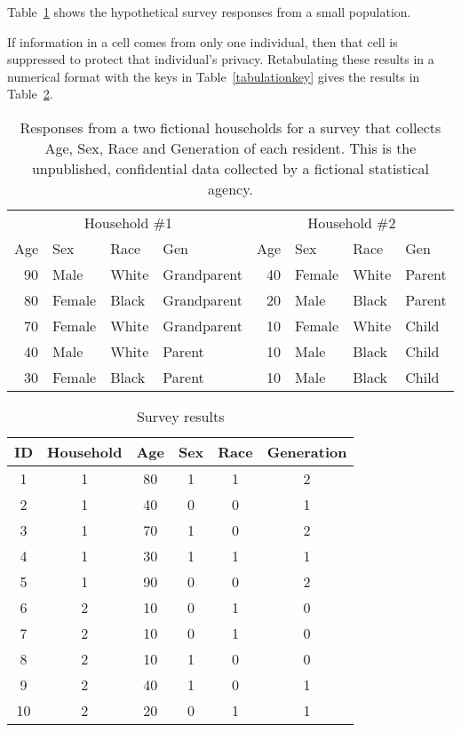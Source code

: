 \documentclass[runningheads]{llncs}
\begin{document}
Table~\ref{responses}
shows the hypothetical survey responses from a small population.

If
information in a cell comes from only one individual, then that cell
is suppressed to protect that individual's privacy.  Retabulating
these results in a numerical format with the keys in
Table~\ref{tabulationkey} gives the results in Table~\ref{resultsbig}.


\begin{table}
\begin{tabular}{rllp{1in}||rllp{1in}}
\multicolumn{4}{c||}{Household \#1}    & \multicolumn{4}{c}{Household \#2} \\
Age & Sex & Race & Gen                 & Age & Sex & Race & Gen \\
\hline
90 & Male & White & Grandparent        & 40 & Female & White & Parent\\
80 & Female & Black & Grandparent      & 20 & Male & Black & Parent\\
70 & Female & White & Grandparent      & 10 & Female & White & Child\\
40 & Male & White & Parent             & 10 & Male & Black & Child\\
30 & Female & Black & Parent           & 10 & Male & Black & Child\\
\hline
\end{tabular}
\caption{Responses from a two fictional households
for a survey that collects Age, Sex, Race and Generation of each resident. This is
the unpublished, confidential data collected by a fictional statistical
agency.}\label{responses}
\end{table}


\begin{table}
\begin{tabular}{c|c|c|c|c|c}
ID & Household & Age & Sex & Race & Generation \\
\hline
1 & 1 & 80 & 1 & 1 & 2  \\
2 & 1 & 40 & 0 & 0 & 1  \\
3 & 1 & 70 & 1 & 0 & 2  \\
4 & 1 & 30 & 1 & 1 & 1  \\
5 & 1 & 90 & 0 & 0 & 2  \\
6 & 2 & 10 & 0 & 1 & 0  \\
7 & 2 & 10 & 0 & 1 & 0  \\
8 & 2 & 10 & 1 & 0 & 0  \\
9 & 2 & 40 & 1 & 0 & 1 \\
10 & 2 & 20 & 0 & 1 & 1 \\
\hline
\end{tabular}
\caption{Survey results}
\label{resultsbig}
\end{table}
\end{document}
